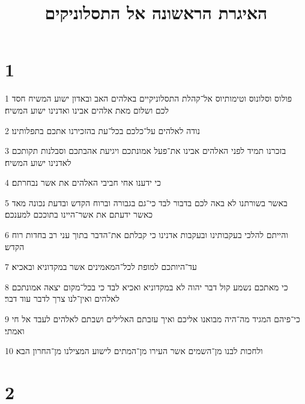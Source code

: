 

\title{האיגרת הראשונה אל התסלוניקים}


\chapter{1}

\par 1 פולוס וסלונוס וטימותיוס אל־קהלת התסלוניקיים באלהים האב ובאדון ישוע המשיח חסד לכם ושלום מאת אלהים אבינו ואדנינו ישוע המשיח׃
\par 2 נודה לאלהים על־כלכם בכל־עת בהזכירנו אתכם בתפלותינו׃
\par 3 בזכרנו תמיד לפני האלהים אבינו את־פעל אמונתכם ויגיעת אהבתכם וסבלנות תקותכם לאדנינו ישוע המשיח׃
\par 4 כי ידענו אחי חביבי האלהים את אשר נבחרתם׃
\par 5 באשר בשורתנו לא באה לכם בדבור לבד כי־גם בגבורה וברוח הקדש ובדעת נכונה מאד כאשר ידעתם את אשר־היינו בתוככם למענכם׃
\par 6 והייתם להלכי בעקבותינו ובעקבות אדנינו כי קבלתם את־הדבר בתוך עני רב בחדות רוח הקדש׃
\par 7 עד־היותכם למופת לכל־המאמינים אשר במקדוניא ובאכיא׃
\par 8 כי מאתכם נשמע קול דבר יהוה לא במקדוניא ואכיא לבד כי בכל־מקום יצאה אמונתכם לאלהים ואין־לנו צרך לדבר עוד דבר׃
\par 9 כי־פיהם המגיד מה־היה מבואנו אליכם ואיך עזבתם האלילים ושבתם לאלהים לעבד אל חי ואמתי׃
\par 10 ולחכות לבנו מן־השמים אשר העירו מן־המתים לישוע המצילנו מן־החרון הבא׃

\chapter{2}

